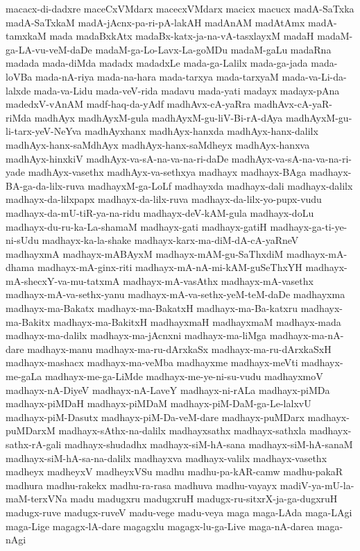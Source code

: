 {macacx-di-dadxre
maceCxVMdarx
macecxVMdarx
macicx
macucx
madA-SaTxka
madA-SaTxkaM
madA-jAcnx-pa-ri-pA-lakAH
madAnAM
madAtAmx
madA-tamxkaM
mada
madaBxkAtx
madaBx-katx-ja-na-vA-tasxlayxM
madaH
madaM-ga-LA-vu-veM-daDe
madaM-ga-Lo-Lavx-La-goMDu
madaM-gaLu
madaRna
madada
mada-diMda
madadx
madadxLe
mada-ga-Lalilx
mada-ga-jada
mada-loVBa
mada-nA-riya
mada-na-hara
mada-tarxya
mada-tarxyaM
mada-va-Li-da-lalxde
mada-va-Lidu
mada-veV-rida
madavu
mada-yati
madayx
madayx-pAna
madedxV-vAnAM
madf-haq-da-yAdf
madhAvx-cA-yaRra
madhAvx-cA-yaR-riMda
madhAyx
madhAyxM-gula
madhAyxM-gu-liV-Bi-rA-dAya
madhAyxM-gu-li-tarx-yeV-NeYva
madhAyxhanx
madhAyx-hanxda
madhAyx-hanx-dalilx
madhAyx-hanx-saMdhAyx
madhAyx-hanx-saMdheyx
madhAyx-hanxva
madhAyx-hinxkiV
madhAyx-va-sA-na-va-na-ri-daDe
madhAyx-va-sA-na-va-na-ri-yade
madhAyx-vasethx
madhAyx-va-sethxya
madhayx
madhayx-BAga
madhayx-BA-ga-da-lilx-ruva
madhayxM-ga-LoLf
madhayxda
madhayx-dali
madhayx-dalilx
madhayx-da-lilxpapx
madhayx-da-lilx-ruva
madhayx-da-lilx-yo-pupx-vudu
madhayx-da-mU-tiR-ya-na-ridu
madhayx-deV-kAM-gula
madhayx-doLu
madhayx-du-ru-ka-La-shamaM
madhayx-gati
madhayx-gatiH
madhayx-ga-ti-ye-ni-sUdu
madhayx-ka-la-shake
madhayx-karx-ma-diM-dA-cA-yaRneV
madhayxmA
madhayx-mABAyxM
madhayx-mAM-gu-SaThxdiM
madhayx-mA-dhama
madhayx-mA-ginx-riti
madhayx-mA-nA-mi-kAM-guSeThxYH
madhayx-mA-shecxY-va-mu-tatxmA
madhayx-mA-vasAthx
madhayx-mA-vasethx
madhayx-mA-va-sethx-yanu
madhayx-mA-va-sethx-yeM-teM-daDe
madhayxma
madhayx-ma-Bakatx
madhayx-ma-BakatxH
madhayx-ma-Ba-katxru
madhayx-ma-Bakitx
madhayx-ma-BakitxH
madhayxmaH
madhayxmaM
madhayx-mada
madhayx-ma-dalilx
madhayx-ma-jAcnxni
madhayx-ma-liMga
madhayx-ma-nA-dare
madhayx-manu
madhayx-ma-ru-dArxkaSx
madhayx-ma-ru-dArxkaSxH
madhayx-mashacx
madhayx-ma-veMba
madhayxme
madhayx-meVti
madhayx-me-gaLa
madhayx-me-ga-LiMde
madhayx-me-ye-ni-su-vudu
madhayxmoV
madhayx-nA-DiyeV
madhayx-nA-LaveY
madhayx-ni-rALa
madhayx-piMDa
madhayx-piMDaH
madhayx-piMDaM
madhayx-piM-DaM-ga-Le-lalxvU
madhayx-piM-Dasutx
madhayx-piM-Da-veM-dare
madhayx-puMDarx
madhayx-puMDarxM
madhayx-sAthx-na-dalilx
madhayxsathx
madhayx-sathxla
madhayx-sathx-rA-gali
madhayx-shudadhx
madhayx-siM-hA-sana
madhayx-siM-hA-sanaM
madhayx-siM-hA-sa-na-dalilx
madhayxva
madhayx-valilx
madhayx-vasethx
madheyx
madheyxV
madheyxVSu
madhu
madhu-pa-kAR-camw
madhu-pakaR
madhura
madhu-rakekx
madhu-ra-rasa
madhuva
madhu-vayayx
madiV-ya-mU-la-maM-terxVNa
madu
madugxru
madugxruH
madugx-ru-sitxrX-ja-ga-dugxruH
madugx-ruve
madugx-ruveV
madu-vege
madu-veya
maga
maga-LAda
maga-LAgi
maga-Lige
magagx-lA-dare
magagxlu
magagx-lu-ga-Live
maga-nA-darea
maga-nAgi
}
